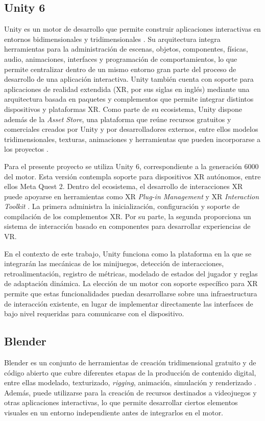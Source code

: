 \subsection{Unity 6}
Unity es un motor de desarrollo que permite construir aplicaciones 
interactivas en entornos bidimensionales y tridimensionales \cite{unity2024requirements}.
Su arquitectura integra herramientas para la administración de escenas, 
objetos, componentes, físicas, audio, animaciones, interfaces y 
programación de comportamientos, lo que permite centralizar dentro de 
un mismo entorno gran parte del proceso de desarrollo de una aplicación 
interactiva. Unity también cuenta con soporte para aplicaciones de 
realidad extendida (XR, por sus siglas en inglés) mediante una 
arquitectura basada en paquetes y complementos que permite integrar 
distintos dispositivos y plataformas XR. Como parte de su ecosistema, 
Unity dispone además de la \textit{Asset Store}, una plataforma que 
reúne recursos gratuitos y comerciales creados por Unity y por 
desarrolladores externos, entre ellos modelos tridimensionales, texturas, 
animaciones y herramientas que pueden incorporarse a los proyectos \cite{unityAssetStore}.

Para el presente proyecto se utiliza Unity 6, correspondiente a la 
generación 6000 del motor. Esta versión contempla soporte para 
dispositivos XR autónomos, entre ellos Meta Quest 2. Dentro del 
ecosistema, el desarrollo de interacciones XR puede apoyarse en 
herramientas como XR \textit{Plug-in Management} y XR 
\textit{Interaction Toolkit}  \cite{unityxrmanagement,unityxrit}. 
La primera administra la inicialización, configuración y soporte de 
compilación de los complementos XR. Por su parte, la segunda 
proporciona un sistema de interacción basado en componentes para 
desarrollar experiencias de VR.

En el contexto de este trabajo, Unity funciona como la plataforma en la 
que se integrarán las mecánicas de los minijuegos, detección de 
interacciones, retroalimentación, registro de métricas, modelado de 
estados del jugador y reglas de adaptación dinámica. La elección de un 
motor con soporte específico para XR permite que estas funcionalidades 
puedan desarrollarse sobre una infraestructura de interacción existente, 
en lugar de implementar directamente las interfaces de bajo nivel 
requeridas para comunicarse con el dispositivo.

\subsection{Blender}
Blender es un conjunto de herramientas de creación tridimensional 
gratuito y de código abierto que cubre diferentes etapas de la 
producción de contenido digital, entre ellas modelado, texturizado, 
\textit{rigging}, animación, simulación y renderizado \cite{blenderfeatures}.
Además, puede utilizarse para la creación de recursos destinados a 
videojuegos y otras aplicaciones interactivas, lo que permite 
desarrollar ciertos elementos visuales en un entorno independiente antes 
de integrarlos en el motor. 

